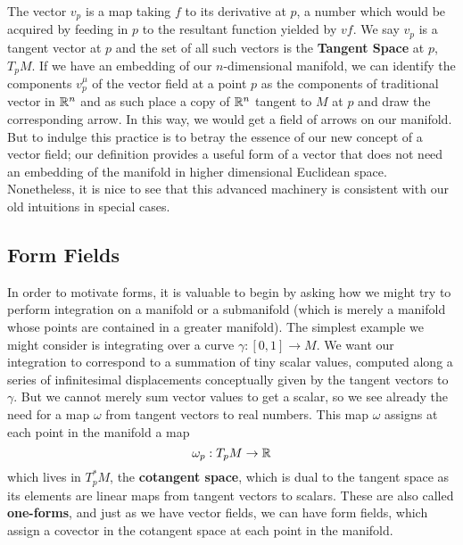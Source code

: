  The vector $v_p$ is a map taking $f$ to its derivative at $p$, a number which would be acquired by feeding in $p$ to the resultant function yielded by $vf$.  We say $v_p$ is a tangent vector at $p$ and the set of all such vectors is the \textbf{Tangent Space} at $p$, $T_pM$.  If we have an embedding of our $n$-dimensional manifold, we can identify the components $v_p^\mu$ of the vector field at a point $p$ as the components of traditional vector in $\mathbb{R}^n$ and as such place a copy of $\mathbb{R}^n$ tangent to $M$ at $p$ and draw the corresponding arrow.  In this way, we would get a field of arrows on our manifold.  But to indulge this practice is to betray the essence of our new concept of a vector field; our definition provides a useful form of a vector that does not need an embedding of the manifold in higher dimensional Euclidean space.  Nonetheless, it is nice to see that this advanced machinery is consistent with our old intuitions in special cases.\\
  

\subsection*{Form Fields}
In order to motivate forms, it is valuable to begin by asking how we might try to perform integration on a manifold or a submanifold (which is merely a manifold whose points are contained in a greater manifold).  The simplest example we might consider is integrating over a curve $\gamma: [0, 1] \to M$.  We want our integration to correspond to a summation of tiny scalar values, computed along a series of infinitesimal displacements conceptually given by the tangent vectors to $\gamma$.  But we cannot merely sum vector values to get a scalar, so we see already the need for a map $\omega$ from tangent vectors to real numbers.  This map $\omega$ assigns at each point in the manifold a map 
\begin{equation*}
	\omega_p: T_pM \to \mathbb{R}
\end{equation*} 
which lives in $T^*_pM$, the \textbf{cotangent space}, which is dual to the tangent space as its elements are linear maps from tangent vectors to scalars.  These are also called \textbf{one-forms}, and just as we have vector fields, we can have form fields, which assign a covector in the cotangent space at each point in the manifold.\\

